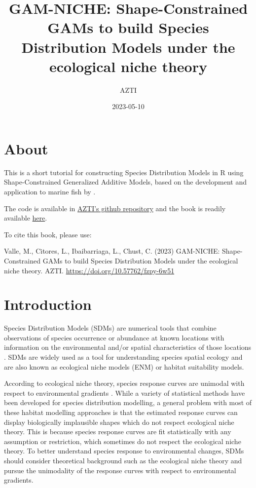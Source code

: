 \documentclass[
]{book}
\title{GAM-NICHE: Shape-Constrained GAMs to build Species Distribution Models under the ecological niche theory}
\author{AZTI}
\date{2023-05-10}
\begin{document}
\maketitle

{
\setcounter{tocdepth}{1}
\tableofcontents
}
\hypertarget{about}{%
\chapter*{About}\label{about}}

This is a short tutorial for constructing Species Distribution Models in R using Shape-Constrained Generalized Additive Models, based on the development and application to marine fish by \citet{citores_etal_2020}.

The code is available in \href{https://github.com/Fundacion-AZTI/gam-niche}{AZTI's github repository} and the book is readily available \href{https://fundacion-azti.github.io/gam-niche/}{here}.

To cite this book, please use:

Valle, M., Citores, L., Ibaibarriaga, L., Chust, C. (2023) GAM-NICHE: Shape-Constrained GAMs to build Species Distribution Models under the ecological niche theory. AZTI. \url{https://doi.org/10.57762/fzpy-6w51}

\hypertarget{introduction}{%
\chapter{Introduction}\label{introduction}}

Species Distribution Models (SDMs) are numerical tools that combine observations of species occurrence or abundance at known locations with information on the environmental and/or spatial characteristics of those locations \citep{elith_etal_2009}. SDMs are widely used as a tool for understanding species spatial ecology and are also known as ecological niche models (ENM) or habitat suitability models.

According to ecological niche theory, species response curves are unimodal with respect to environmental gradients \citep{hutchinson_1957}. While a variety of statistical methods have been developed for species distribution modelling, a general problem with most of these habitat modelling approaches is that the estimated response curves can display biologically implausible shapes which do not respect ecological niche theory. This is because species response curves are fit statistically with any assumption or restriction, which sometimes do not respect the ecological niche theory. To better understand species response to environmental changes, SDMs should consider theoretical background such as the ecological niche theory and pursue the unimodality of the response curves with respect to environmental gradients.
\end{document}
